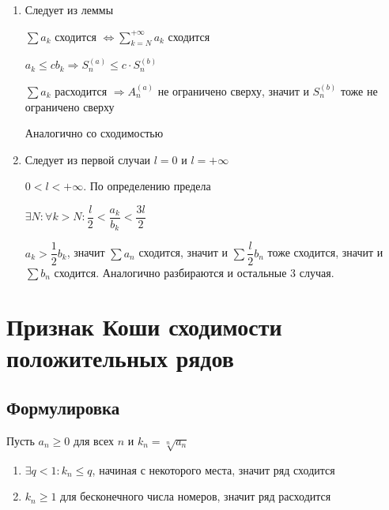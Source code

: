 \documentclass{article}
\begin{document}
                \begin{enumerate}
                
                    \item Следует из леммы
                    
                        $\sum a_k$ сходится $\Leftrightarrow \sum\limits^{+\infty}_{k = N} a_k$ сходится
                        
                        $a_k \leq c b_k \Rightarrow S_n^{(a)} \leq c \cdot S^{(b)}_n$
                        
                        $\sum a_k$ расходится $\Rightarrow A^{(a)}_n$ не ограничено сверху, значит и $S^{(b)}_n$ тоже не ограничено сверху
                        
                        Аналогично со сходимостью
                        
                    \item Следует из первой случаи $l = 0$ и $l = +\infty$
                    
                        $0 < l < +\infty$. По определению предела
                        
                            $\exists N : \forall k > N : \dfrac{l}{2} < \dfrac{a_k}{b_k} < \dfrac{3l}{2}$
                            
                            $a_k > \dfrac{1}{2} b_k$, значит $\sum a_n$ сходится, значит и $\sum \dfrac{l}{2} b_n$ тоже сходится, значит и $\sum b_n$ сходится. Аналогично разбираются и остальные $3$ случая.
                    
                \end{enumerate}
                
    \newpage
    
    \section{Признак Коши сходимости положительных рядов}
    
        \subsection{Формулировка}
        
            Пусть $a_n \geq 0$ для всех $n$ и $k_n = \sqrt[n]{a_n}$
            
            \begin{enumerate}
            
                \item $\exists q < 1 : k_n \leq q$, начиная с некоторого места, значит ряд сходится 
                
                \item $k_n \geq 1$ для бесконечного числа номеров, значит ряд расходится
                
            \end{enumerate}
            
\end{document}
